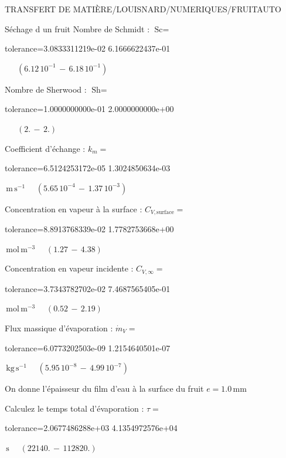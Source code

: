 \documentclass[12pt]{article}
\begin{document}
\begin{quiz}{TRANSFERT DE MATIÈRE/LOUISNARD/NUMERIQUES/FRUITAUTO}
\begin{cloze}{Séchage d un fruit}
Nombre de Schmidt : $\text{Sc} =  $
\begin{numerical}[points=1] 
\item[tolerance={3.0833311219e-02}] 6.1666622437e-01 
\end{numerical} 
 $\,$ 
 $ \quad ( 6.12 \, 10^{-1}  \, - \,  6.18 \, 10^{-1} ) $ 

Nombre de Sherwood : $\text{Sh} =  $
\begin{numerical}[points=2] 
\item[tolerance={1.0000000000e-01}] 2.0000000000e+00 
\end{numerical} 
 $\,$ 
 $ \quad (2. \, - \, 2.) $ 

Coefficient d'échange : $k_m =  $
\begin{numerical}[points=1] 
\item[tolerance={6.5124253172e-05}] 1.3024850634e-03 
\end{numerical} 
 $\,  \mathrm{m}\,  \mathrm{s}^{-1}$ 
 $ \quad ( 5.65 \, 10^{-4}  \, - \,  1.37 \, 10^{-3} ) $ 

Concentration en vapeur à la surface : $C_{V, \text{surface}} =  $
\begin{numerical}[points=2] 
\item[tolerance={8.8913768339e-02}] 1.7782753668e+00 
\end{numerical} 
 $\,  \mathrm{mol}\,  \mathrm{m}^{-3}$ 
 $ \quad (1.27 \, - \, 4.38) $ 

Concentration en vapeur incidente : $C_{V, \infty} =  $
\begin{numerical}[points=2] 
\item[tolerance={3.7343782702e-02}] 7.4687565405e-01 
\end{numerical} 
 $\,  \mathrm{mol}\,  \mathrm{m}^{-3}$ 
 $ \quad (0.52 \, - \, 2.19) $ 

Flux massique d'évaporation : $\dot{m}_V =  $
\begin{numerical}[points=1] 
\item[tolerance={6.0773202503e-09}] 1.2154640501e-07 
\end{numerical} 
 $\,  \mathrm{kg}\,  \mathrm{s}^{-1}$ 
 $ \quad ( 5.95 \, 10^{-8}  \, - \,  4.99 \, 10^{-7} ) $ 

 

On donne l'épaisseur du film d'eau à la surface du fruit $e = 1.0\,  \mathrm{mm} $

Calculez le temps total d'évaporation : $\tau =  $
\begin{numerical}[points=2] 
\item[tolerance={2.0677486288e+03}] 4.1354972576e+04 
\end{numerical} 
 $\,  \mathrm{s}$ 
 $ \quad (22140. \, - \, 112820.) $ 


\end{cloze}
\end{quiz}
\end{document}

